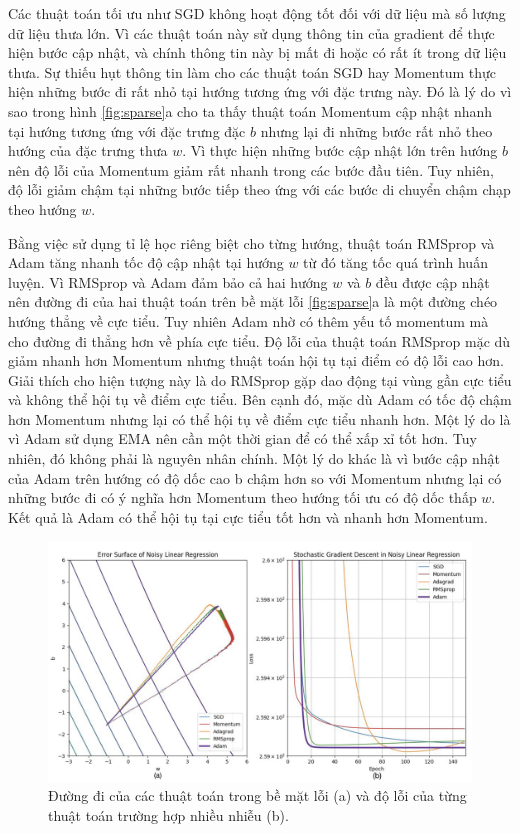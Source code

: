 Các thuật toán tối ưu như SGD không hoạt động tốt đối với dữ liệu mà số lượng dữ liệu thưa lớn. Vì các thuật toán này sử dụng thông tin của gradient để thực hiện bước cập nhật, và chính thông tin này bị mất đi hoặc có rất ít trong dữ liệu thưa. Sự thiếu hụt thông tin làm cho các thuật toán SGD hay Momentum thực hiện những bước đi rất nhỏ tại hướng tương ứng với đặc trưng này. Đó là lý do vì sao trong hình \ref{fig:sparse}a cho ta thấy thuật toán Momentum cập nhật nhanh tại hướng tương ứng với đặc trưng đặc $b$ nhưng lại đi những bước rất nhỏ theo hướng của đặc trưng thưa $w$. Vì thực hiện những bước cập nhật lớn trên hướng $b$ nên độ lỗi của Momentum giảm rất nhanh trong các bước đầu tiên. Tuy nhiên, độ lỗi giảm chậm tại những bước tiếp theo ứng với các bước di chuyển chậm chạp theo hướng $w$.

Bằng việc sử dụng tỉ lệ học riêng biệt cho từng hướng, thuật toán RMSprop và Adam tăng nhanh tốc độ cập nhật tại hướng $w$ từ đó tăng tốc quá trình huấn luyện. Vì RMSprop và Adam đảm bảo cả hai hướng $w$ và $b$ đều được cập nhật nên đường đi của hai thuật toán trên bề mặt lỗi \ref{fig:sparse}a là một đường chéo hướng thẳng về cực tiểu. Tuy nhiên Adam nhờ có thêm yếu tố momentum mà cho đường đi thẳng hơn về phía cực tiểu. Độ lỗi của thuật toán RMSprop mặc dù giảm nhanh hơn Momentum nhưng thuật toán hội tụ tại điểm có độ lỗi cao hơn. Giải thích cho hiện tượng này là do RMSprop gặp dao động tại vùng gần cực tiểu và không thể hội tụ về điểm cực tiểu. Bên cạnh đó, mặc dù Adam có tốc độ chậm hơn Momentum nhưng lại có thể hội tụ về điểm cực tiểu nhanh hơn. Một lý do là vì Adam sử dụng EMA nên cần một thời gian để có thể xấp xỉ tốt hơn. Tuy nhiên, đó không phải là nguyên nhân chính. Một lý do khác là vì bước cập nhật của Adam trên hướng có độ dốc cao b chậm hơn so với Momentum nhưng lại có những bước đi có ý nghĩa hơn Momentum theo hướng tối ưu có độ dốc thấp $w$. Kết quả là Adam có thể hội tụ tại cực tiểu tốt hơn và nhanh hơn Momentum.

\begin{figure}[htp]
	\centering
	\includegraphics[width=140 mm]{images/noise.jpeg}
	\caption{Đường đi của các thuật toán trong bề mặt lỗi (a) và độ lỗi của từng thuật toán trường hợp nhiều nhiễu (b).}
	\label{fig:noise}
\end{figure}

